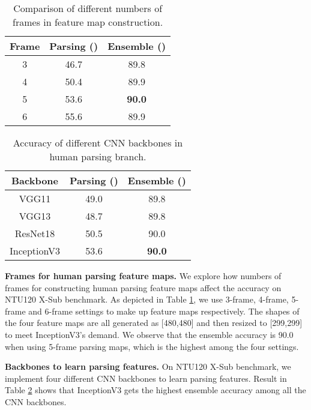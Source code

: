 \documentclass[runningheads]{llncs}
\begin{document}
\begin{table}[t]
\caption{Comparison of different numbers of frames in feature map construction.}
\centering
\begin{tabular}{c|c|c}
\hline
\textbf{Frame} & \textbf{Parsing} () & \textbf{Ensemble} () \\\hline
3 & 46.7 & 89.8 \\\hline
4 & 50.4 & 89.9 \\\hline
5 & 53.6 & \textbf{90.0} \\\hline
6 & 55.6 & 89.9 \\\hline
\end{tabular}
\label{tab:frame}
\end{table}


\begin{table}[t]
\caption{Accuracy of different CNN backbones in human parsing branch.}
\centering
\begin{tabular}{c|c|c}
\hline
\textbf{Backbone} & \textbf{Parsing} () & \textbf{Ensemble} () \\\hline
VGG11 \cite{simonyan2015deep} & 49.0 & 89.8 \\\hline
VGG13 \cite{simonyan2015deep} & 48.7 & 89.8 \\\hline
ResNet18 \cite{he2015deep} & 50.5 & 90.0 \\\hline
InceptionV3 \cite{szegedy2016rethinking} & 53.6 & \textbf{90.0} \\\hline
\end{tabular}
\label{tab:CNN}
\end{table}

\textbf{Frames for human parsing feature maps.} We explore how numbers of frames for constructing human parsing feature maps affect the accuracy on NTU120 X-Sub benchmark. As depicted in Table \ref{tab:frame}, we use 3-frame, 4-frame, 5-frame and 6-frame settings to make up feature maps respectively. The shapes of the four feature maps are all generated as [480,480] and then resized to [299,299] to meet InceptionV3's demand. We observe that the ensemble accuracy is 90.0 when using 5-frame parsing maps, which is the highest among the four settings.

\textbf{Backbones to learn parsing features.} On NTU120 X-Sub benchmark, we implement four different CNN backbones to learn parsing features. Result in Table \ref{tab:CNN} shows that InceptionV3 gets the highest ensemble accuracy among all the CNN backbones.
\end{document}
